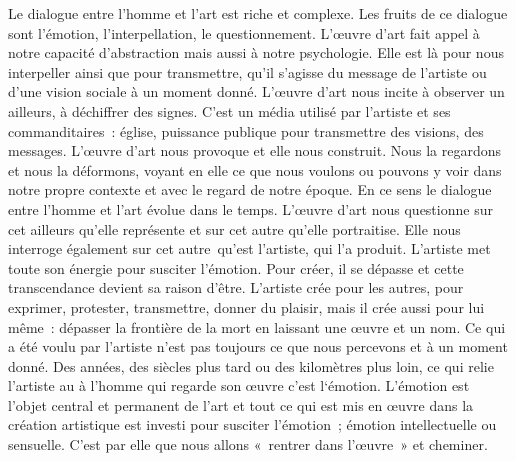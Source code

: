 	Le dialogue  entre l’homme et l’art est riche et complexe. Les fruits de ce dialogue sont l’émotion, l’interpellation, le questionnement. L’œuvre d’art fait appel à notre capacité d’abstraction mais aussi à notre psychologie. Elle est là pour nous interpeller ainsi que pour transmettre, qu’il s’agisse du message de l’artiste ou d’une vision sociale à un moment donné. L’œuvre d’art nous incite à observer un ailleurs, à déchiffrer des signes. C’est un média utilisé par l’artiste et ses commanditaires : église, puissance publique pour transmettre des visions, des messages.
L’œuvre d’art nous provoque et elle nous construit. Nous la regardons et nous la déformons, voyant en elle ce que nous voulons ou pouvons y voir dans notre propre contexte et avec le regard de notre époque.  En ce sens le dialogue entre l’homme et l’art évolue dans le temps. L’œuvre d’art nous questionne  sur cet ailleurs qu’elle représente et sur cet autre qu’elle portraitise. Elle nous interroge également sur cet autre qu’est  l’artiste, qui l’a produit. 
L’artiste met toute son énergie pour susciter l’émotion. Pour créer, il se dépasse et  cette transcendance devient sa raison d’être. L’artiste crée pour les autres, pour exprimer, protester, transmettre, donner du plaisir,  mais il crée aussi pour lui même : dépasser la frontière de la mort en laissant une œuvre et un nom. 
Ce qui a été voulu par l’artiste n’est pas toujours ce que nous percevons et à un moment donné. Des années, des siècles plus tard ou des kilomètres plus loin, ce qui relie l’artiste au à l’homme qui regarde son œuvre c’est l‘émotion. L’émotion est l’objet central et permanent de l’art et tout ce qui est mis en œuvre dans la création artistique est investi pour susciter l’émotion ; émotion intellectuelle ou sensuelle. C’est par elle que nous allons « rentrer dans l’œuvre » et cheminer. 
